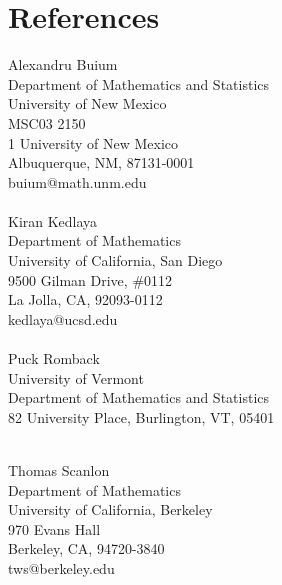 \documentclass[a4paper,10pt]{article}
\begin{document}
\section*{References}


\begin{multicols}{2}
	\begin{flushleft}
		Alexandru Buium\\
		Department of Mathematics and Statistics\\
		University of New Mexico\\
		MSC03 2150\\
		1 University of New Mexico\\
		Albuquerque, NM, 87131-0001\\
		buium@math.unm.edu\\ \ \\
	
		Kiran Kedlaya\\
		Department of Mathematics\\
		University of California, San Diego\\
		9500 Gilman Drive, \#0112\\
		La Jolla, CA, 92093-0112\\
		kedlaya@ucsd.edu \\ \ \\
		
		Puck Romback \\
		University of Vermont \\
		Department of Mathematics and Statistics \\
		82 University Place, Burlington, VT, 05401  \\ \ \\

\end{flushleft}

\begin{flushleft}
	Thomas Scanlon\\
Department of Mathematics\\
University of California, Berkeley\\
970 Evans Hall\\
Berkeley, CA, 94720-3840\\
tws@berkeley.edu \\ \ \\



\end{flushleft}
\end{multicols}
\end{document}
